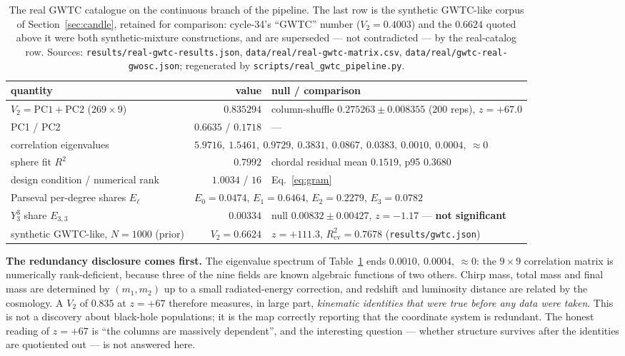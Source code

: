 \documentclass[11pt,a4paper]{article}
\theoremstyle{plain}
\theoremstyle{remark}
\theoremstyle{plain}
\begin{document}
\begin{table}[h]
\centering
\small
\begin{tabular}{lrl}
\toprule
quantity & value & null / comparison \\
\midrule
$V_2=\mathrm{PC1}+\mathrm{PC2}$ ($269\times9$) & $\mathbf{0.835294}$ & column-shuffle $0.275263\pm0.008355$ ($200$ reps), $z=\mathbf{+67.0}$ \\
PC1 / PC2 & $0.6635$ / $0.1718$ & --- \\
correlation eigenvalues & \multicolumn{2}{l}{$5.9716,\ 1.5461,\ 0.9729,\ 0.3831,\ 0.0867,\ 0.0383,\ 0.0010,\ 0.0004,\ \approx0$} \\
sphere fit $R^2$ & $0.7992$ & chordal residual mean $0.1519$, p95 $0.3680$ \\
design condition / numerical rank & $1.0034$ / $16$ & Eq.~\eqref{eq:gram} \\
Parseval per-degree shares $E_\ell$ & \multicolumn{2}{l}{$E_0=0.0474$, $E_1=0.6464$, $E_2=0.2279$, $E_3=0.0782$} \\
$Y_3^3$ share $E_{3,3}$ & $0.00334$ & null $0.00832\pm0.00427$, $z=\mathbf{-1.17}$ --- \textbf{not significant} \\
\midrule
synthetic GWTC-like, $N=1000$ (prior) & $V_2=0.6624$ & $z=+111.3$, $R^2_{\mathrm{cv}}=0.7678$ (\texttt{results/gwtc.json}) \\
\bottomrule
\end{tabular}
\caption{The real GWTC catalogue on the continuous branch of the pipeline. The last row is the synthetic GWTC-like corpus of Section~\ref{sec:candle}, retained for comparison: cycle-34's ``GWTC'' number ($V_2=0.4003$) and the $0.6624$ quoted above it were both synthetic-mixture constructions, and are superseded --- not contradicted --- by the real-catalog row. Sources: \texttt{results/real-gwtc-results.json}, \texttt{data/real/real-gwtc-matrix.csv}, \texttt{data/real/gwtc-real-gwosc.json}; regenerated by \texttt{scripts/real\_gwtc\_pipeline.py}.}
\label{tab:gwtcreal}
\end{table}

\textbf{The redundancy disclosure comes first.} The eigenvalue spectrum of Table~\ref{tab:gwtcreal} ends $0.0010,\ 0.0004,\ \approx0$: the $9\times9$ correlation matrix is numerically rank-deficient, because three of the nine fields are known algebraic functions of two others. Chirp mass, total mass and final mass are determined by $(m_1,m_2)$ up to a small radiated-energy correction, and redshift and luminosity distance are related by the cosmology. A $V_2$ of $0.835$ at $z=+67$ therefore measures, in large part, \emph{kinematic identities that were true before any data were taken}. This is not a discovery about black-hole populations; it is the map correctly reporting that the coordinate system is redundant. The honest reading of $z=+67$ is ``the columns are massively dependent'', and the interesting question --- whether structure survives after the identities are quotiented out --- is not answered here.
\end{document}
